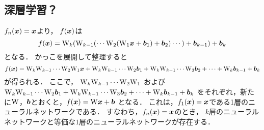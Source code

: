   \clearpage
  \subsection{深層学習？}
    $f_n(\boldsymbol{x}) = \boldsymbol{x}$より，
    $f(\boldsymbol{x})$は
    \begin{equation}
      f(\boldsymbol{x}) = \mathrm{W}_k (\mathrm{W}_{k-1} (\cdots \mathrm{W}_2 (\mathrm{W}_1 \boldsymbol{x} + \boldsymbol{b}_1) + \boldsymbol{b}_2) \cdots) + \boldsymbol{b}_{k-1}) + \boldsymbol{b}_k
    \end{equation}
    となる．
    かっこを展開して整理すると
    \begin{equation}
      f(\boldsymbol{x}) = \mathrm{W}_k \mathrm{W}_{k-1} \cdots \mathrm{W}_2 \mathrm{W}_1 \boldsymbol{x} + \mathrm{W}_k \mathrm{W}_{k-1} \cdots \mathrm{W}_2 \boldsymbol{b}_1 + \mathrm{W}_k \mathrm{W}_{k-1} \cdots \mathrm{W}_3 \boldsymbol{b}_2 + \cdots + \mathrm{W}_k \boldsymbol{b}_{k-1} + \boldsymbol{b}_k
    \end{equation}
    が得られる．
    ここで，
    $\mathrm{W}_k \mathrm{W}_{k-1} \cdots \mathrm{W}_2 \mathrm{W}_1$
    および
    $\mathrm{W}_k \mathrm{W}_{k-1} \cdots \mathrm{W}_2 \boldsymbol{b}_1 + \mathrm{W}_k \mathrm{W}_{k-1} \cdots \mathrm{W}_3 \boldsymbol{b}_2 + \cdots + \mathrm{W}_k \boldsymbol{b}_{k-1} + \boldsymbol{b}_k$
    をそれぞれ，新たに$\mathrm{W}$，$\boldsymbol{b}$とおくと，$f(\boldsymbol{x}) = \mathrm{W} \boldsymbol{x} + \boldsymbol{b}$
    となる．
    これは，$f_1(\boldsymbol{x}) = \boldsymbol{x}$である1層のニューラルネットワークである．
    すなわち，$f_n(\boldsymbol{x}) = \boldsymbol{x}$のとき，
    $k$層のニューラルネットワークと等価な$1$層のニューラルネットワークが存在する．

